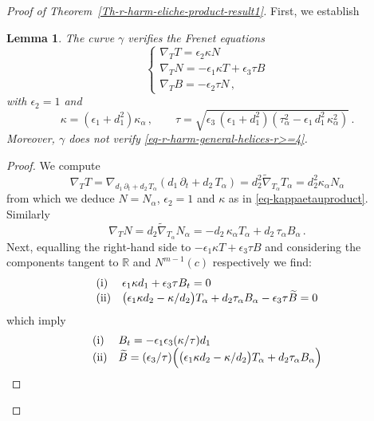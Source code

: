 \documentclass[11pt]{amsart}
\theoremstyle{plain}
\newtheorem{lemma}        [theorem]  {Lemma}
\theoremstyle{definition}
\numberwithin{equation}{section}
\def \R{{\mathbb R}}
\begin{document}
\begin{proof}[Proof of Theorem~\ref{Th-r-harm-eliche-product-result1}]
First, we establish
\begin{lemma}\label{lemma-gamma-elica} The curve $\gamma$ verifies the Frenet equations
\begin{equation}\label{Fren-eq-pseudo-bis}
\begin{cases}
\nabla_T T=\epsilon_2 \kappa N \\
\nabla_T N=-\epsilon_1 \kappa T+\epsilon_3 \tau B\\
\nabla_T B=-\epsilon_2 \tau N\,,
\end{cases}
\end{equation}
with $\epsilon_2=1$ and
\begin{equation}\label{eq-kappaetauproduct}
\kappa=(\epsilon_1+d_1^2)\kappa_\alpha\,, \quad \quad \tau=\sqrt{\epsilon_3\,(\epsilon_1+d_1^2) \left (\tau_\alpha^2-\epsilon_1 \,d_1^2\,\kappa_\alpha^2 \right )}\,.
\end{equation}
Moreover, $\gamma$ does not verify \eqref{eq-r-harm-general-helices-r>=4}.
\end{lemma}
\begin{proof} We compute
\[
\nabla_T T= \nabla_{ d_1\, \partial_t+d_2\, T_\alpha} \left ( d_1\, \partial_t+d_2\, T_\alpha\right )=d_2^2 \widetilde{\nabla}_{T_\alpha} T_{\alpha}= d_2^2 \kappa_\alpha N_\alpha
\]
from which we deduce $N=N_\alpha$, $\epsilon_2=1$ and $\kappa$ as in \eqref{eq-kappaetauproduct}. Similarly
\[
\nabla_T N=d_2 \widetilde{\nabla}_{T_\alpha} N_\alpha=-d_2\, \kappa_\alpha T_\alpha + d_2\, \tau_\alpha B_\alpha\,.
\]
Next, equalling the right-hand side to $-\epsilon_1 \kappa T + \epsilon_3 \tau B$ and considering the components tangent to $\R$ and $N^{m-1}(c)$ respectively we find:
\begin{equation*}\label{eq-1-lemma}
\begin{array}{ll}
{\rm (i)}& \epsilon_1 \kappa d_1 + \epsilon_3 \tau B_t=0 \\
{\rm (ii)}& \big (\epsilon_1 \kappa d_2-\kappa/d_2 \big )T_\alpha + d_2 \tau_\alpha B_\alpha-\epsilon_3 \tau \widetilde{B}=0
\end{array}
\end{equation*}
which imply
\begin{equation}\label{eq-2-lemma}
\begin{array}{ll}
{\rm (i)}& B_t=-\epsilon_1 \epsilon_3 (\kappa / \tau) d_1 \\
{\rm (ii)}& \widetilde{B}=(\epsilon_3 /  \tau)\Big (\big (\epsilon_1 \kappa d_2-\kappa/d_2 \big )T_\alpha + d_2\tau_\alpha B_\alpha\Big )

\end{array}
\end{equation}
\end{proof}
\end{proof}
\end{document}
